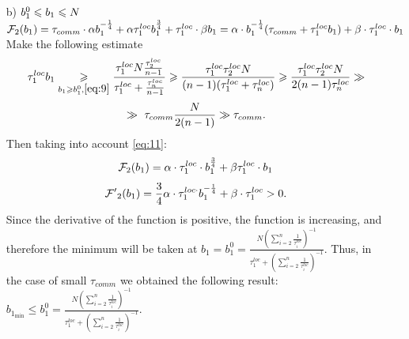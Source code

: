 \documentclass{article}
\theoremstyle{definition}
\theoremstyle{plain}
\begin{document}
\begin{itemize}
    \item[b)] $b_1^0\leq b_1\leq N\\$
    $\mathcal{F}_2(b_1) = \tau_{comm}\cdot 
    \alpha  b_1^{-\frac{1}{4}} + 
    \alpha\tau_1^{loc} b_1^{\frac{3}{4}}  + \tau_1^{loc}\cdot \beta b_1 =  \alpha\cdot b_1^{-\frac{1}{4}}(\tau_{comm} + \tau_1^{loc}b_1) + \beta\cdot\tau_1^{loc}\cdot b_1\\$
    Make the following estimate
    \begin{equation}
    \label{eq:11}
      \tau_1^{loc}b_1\underset{b_1\geq b_1^0, \eqref{eq:9}}{\geq} \frac{\tau_1^{loc}N\frac{\tau_2^{loc}}{n - 1}}{\tau_1^{loc} + \frac{\tau_n^{loc}}{n - 1}}\geq \frac{\tau_1^{loc}\tau_2^{loc}N}{(n - 1)(\tau_1^{loc} + \tau_n^{loc})}\geq \frac{\tau_1^{loc}\tau_2^{loc}N}{2(n - 1)\tau_n^{loc}} \gg
    \end{equation}
    \begin{equation}
         \notag
         \gg ~
       \tau_{comm}\frac{N}{2(n - 1)} \gg \tau_{comm}.
    \end{equation}
    Then taking into account \eqref{eq:11}:
    \begin{equation}
        \notag
        \mathcal F_2(b_1) = \alpha\cdot\tau_1^{loc}\cdot b_1^{\frac{3}{4}} + \beta \tau_1^{loc}\cdot b_1
    \end{equation}
    \begin{equation}
        \notag
        \mathcal{F'}_2(b_1) = \frac{3}{4}\alpha\cdot\tau_1^{loc\cdot} b_1^{-\frac{1}{4}} + \beta\cdot\tau_1^{loc} > 0.
    \end{equation}
    Since the derivative of the function is positive, the function is increasing, and therefore the minimum will be taken at $b_1 = b_1^{0} = \frac{N (\sum\limits_{i = 2}^{n} \frac{1}{\tau_i^{loc}})^{-1}}{\tau_1^{loc} + (\sum\limits_{i = 2}^{n} \frac{1}{\tau_i^{loc}})^{-1}}.$  
Thus, in the case of small $\tau_{comm}$ we obtained the following result:\\
$b_{1_{\min}} \leq b_1^0 = \frac{N (\sum\limits_{i = 2}^{n} \frac{1}{\tau_i^{loc}})^{-1}}{\tau_1^{loc} + (\sum\limits_{i = 2}^{n} \frac{1}{\tau_i^{loc}})^{-1}}$.
\end{itemize}
\end{document}
